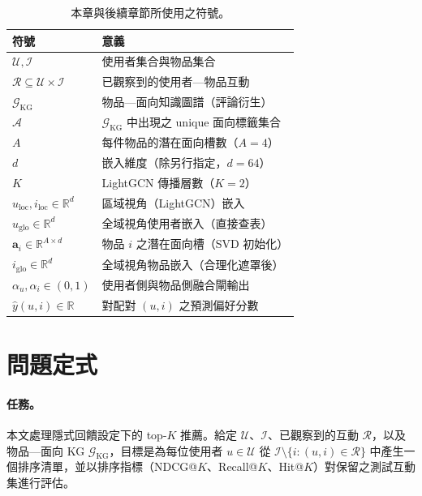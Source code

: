 \begin{table}[ht]
\centering
\caption{本章與後續章節所使用之符號。}
\label{tab:notation-zh}
\begin{tabular}{ll}
\toprule
符號 & 意義 \\
\midrule
$\mathcal{U}, \mathcal{I}$           & 使用者集合與物品集合 \\
$\mathcal{R} \subseteq \mathcal{U} \times \mathcal{I}$ & 已觀察到的使用者—物品互動 \\
$\mathcal{G}_{\mathrm{KG}}$          & 物品—面向知識圖譜（評論衍生） \\
$\mathcal{A}$                        & $\mathcal{G}_{\mathrm{KG}}$ 中出現之 unique 面向標籤集合 \\
$A$                                  & 每件物品的潛在面向槽數（$A=4$） \\
$d$                                  & 嵌入維度（除另行指定，$d=64$） \\
$K$                                  & LightGCN 傳播層數（$K=2$） \\
$u_{\mathrm{loc}}, i_{\mathrm{loc}} \in \mathbb{R}^d$ & 區域視角（LightGCN）嵌入 \\
$u_{\mathrm{glo}} \in \mathbb{R}^d$   & 全域視角使用者嵌入（直接查表） \\
$\mathbf{a}_i \in \mathbb{R}^{A \times d}$ & 物品 $i$ 之潛在面向槽（SVD 初始化） \\
$i_{\mathrm{glo}} \in \mathbb{R}^d$    & 全域視角物品嵌入（合理化遮罩後） \\
$\alpha_u, \alpha_i \in (0,1)$        & 使用者側與物品側融合閘輸出 \\
$\hat{y}(u, i) \in \mathbb{R}$         & 對配對 $(u, i)$ 之預測偏好分數 \\
\bottomrule
\end{tabular}
\end{table}

\section{問題定式}
\label{sec:approach-problem-zh}

\paragraph{任務。} 本文處理隱式回饋設定下的 top-$K$ 推薦。給定 $\mathcal{U}$、$\mathcal{I}$、已觀察到的互動 $\mathcal{R}$，以及物品—面向 KG $\mathcal{G}_{\mathrm{KG}}$，目標是為每位使用者 $u \in \mathcal{U}$ 從 $\mathcal{I} \setminus \{i : (u, i) \in \mathcal{R}\}$ 中產生一個排序清單，並以排序指標（NDCG@$K$、Recall@$K$、Hit@$K$）對保留之測試互動集進行評估。

